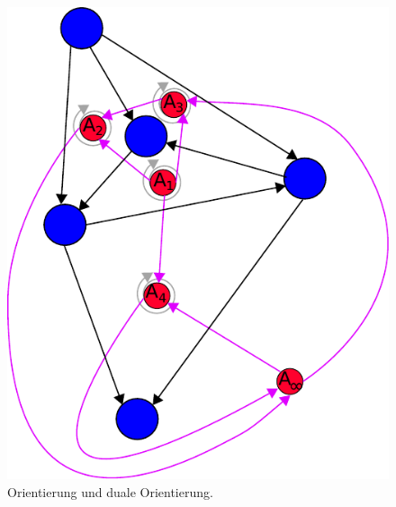 \documentclass[11pt,a4paper,leqno]{report}
\numberwithin{equation}{chapter}
\begin{document}
\begin{figure}[H]
	\begin{center}
		\includegraphics[scale=0.4]{Abbildungen/graph_1_dual_orient.pdf}
		\caption{Orientierung und duale Orientierung.}
	\end{center}
\end{figure}
\noindent
\end{document}

